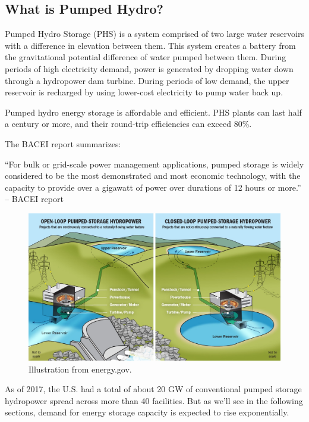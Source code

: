 \documentclass[hidelinks,12pt,a4paper]{article}
\begin{document}
\subsection{What is Pumped Hydro?}
Pumped Hydro Storage (PHS) is a system comprised of two large water reservoirs with a difference in elevation between them. This system creates a battery from the gravitational potential difference of water pumped between them. During periods of high electricity demand, power is generated by dropping water down through a hydropower dam turbine. During periods of low demand, the upper reservoir is recharged by using lower-cost electricity to pump water back up.

Pumped hydro energy storage is affordable and efficient. PHS plants can last half a century or more, and their round-trip efficiencies can exceed 80\%. \cite{USGridEnergyStorageFactsheet}

The BACEI report summarizes:

\begin{displayquote}
“For bulk or grid-scale power management applications, pumped storage is widely considered to be the most demonstrated and most economic technology, with the capacity to provide over a gigawatt of power over durations of 12 hours or more.” \cite{EnergyStorageCaliforniaClimateandEnergyGoals} -- BACEI report
\end{displayquote}

\begin{figure}[ht!]
    \centering
    \includegraphics[width=1.00\textwidth]{111148-5000-wpto_pumped_storage_illustration_0.jpg}
    \caption{Illustration from energy.gov. \cite{EnergyGovPumpedStorageHydropower}}
\end{figure}
\FloatBarrier

As of 2017, the U.S. had a total of about 20 GW of conventional pumped storage hydropower spread across more than 40 facilities. \cite{EnergyStorageCaliforniaClimateandEnergyGoals} But as we'll see in the following sections, demand for energy storage capacity is expected to rise exponentially.
\end{document}
